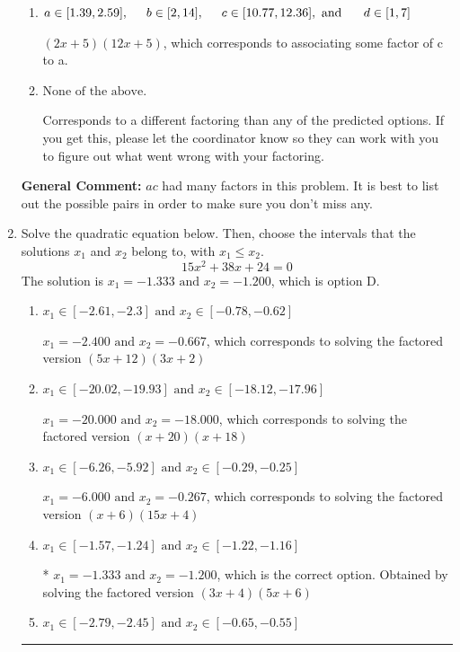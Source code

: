 \documentclass{extbook}[14pt]
\newcommand{\litem}[1]{\item #1

\rule{\textwidth}{0.4pt}}
\begin{document}
\begin{enumerate}
{\begin{enumerate}[label=\Alph*.]
 $(x + 20)(x + 30)$, which corresponds to factoring $x^{2} +50 x + 600$.
\item \( a \in [1.39, 2.59], \hspace*{5mm} b \in [2, 14], \hspace*{5mm} c \in [10.77, 12.36], \text{ and } \hspace*{5mm} d \in [1, 7] \)

 $(2x + 5)(12x + 5)$, which corresponds to associating some factor of c to a.
\item \( \text{None of the above.} \)

 Corresponds to a different factoring than any of the predicted options. If you get this, please let the coordinator know so they can work with you to figure out what went wrong with your factoring.
\end{enumerate}

\textbf{General Comment:} $ac$ had many factors in this problem. It is best to list out the possible pairs in order to make sure you don't miss any.
}
\litem{
Solve the quadratic equation below. Then, choose the intervals that the solutions $x_1$ and $x_2$ belong to, with $x_1 \leq x_2$.
\[ 15x^{2} +38 x + 24 = 0 \]
The solution is \( x_1 = -1.333 \text{ and } x_2 = -1.200 \), which is option D.\begin{enumerate}[label=\Alph*.]
\item \( x_1 \in [-2.61, -2.3] \text{ and } x_2 \in [-0.78, -0.62] \)

$x_1 = -2.400 \text{ and } x_2 = -0.667$, which corresponds to solving the factored version $(5x + 12)(3x + 2)$
\item \( x_1 \in [-20.02, -19.93] \text{ and } x_2 \in [-18.12, -17.96] \)

$x_1 = -20.000 \text{ and } x_2 = -18.000$, which corresponds to solving the factored version $(x + 20)(x + 18)$
\item \( x_1 \in [-6.26, -5.92] \text{ and } x_2 \in [-0.29, -0.25] \)

$x_1 = -6.000 \text{ and } x_2 = -0.267$, which corresponds to solving the factored version $(x + 6)(15x + 4)$
\item \( x_1 \in [-1.57, -1.24] \text{ and } x_2 \in [-1.22, -1.16] \)

* $x_1 = -1.333 \text{ and } x_2 = -1.200$, which is the correct option. Obtained by solving the factored version $(3x + 4)(5x + 6)$
\item \( x_1 \in [-2.79, -2.45] \text{ and } x_2 \in [-0.65, -0.55] \)


\end{enumerate}}
\end{enumerate}
\end{document}
